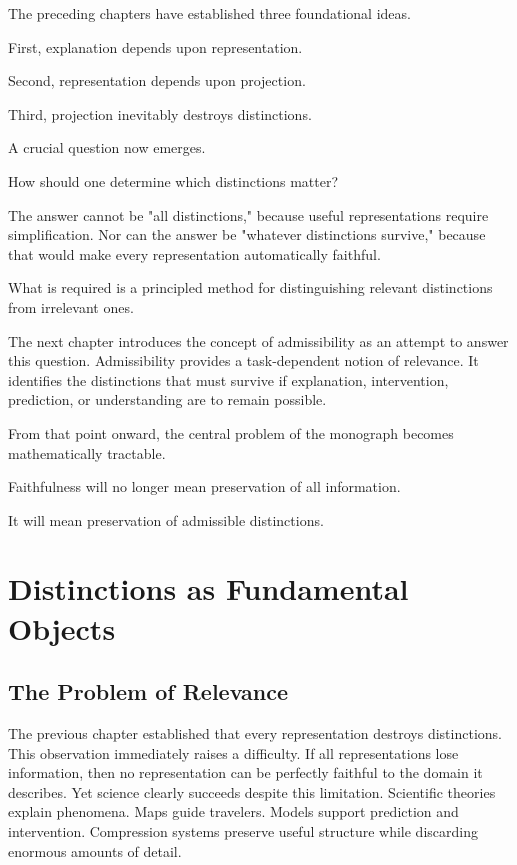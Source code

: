 \documentclass[11pt,oneside,openany]{book}
\begin{document}
The preceding chapters have established three foundational ideas.

First, explanation depends upon representation.

Second, representation depends upon projection.

Third, projection inevitably destroys distinctions.

A crucial question now emerges.

How should one determine which distinctions matter?

The answer cannot be "all distinctions," because useful representations require simplification. Nor can the answer be "whatever distinctions survive," because that would make every representation automatically faithful.

What is required is a principled method for distinguishing relevant distinctions from irrelevant ones.

The next chapter introduces the concept of admissibility as an attempt to answer this question. Admissibility provides a task-dependent notion of relevance. It identifies the distinctions that must survive if explanation, intervention, prediction, or understanding are to remain possible.

From that point onward, the central problem of the monograph becomes mathematically tractable.

Faithfulness will no longer mean preservation of all information.

It will mean preservation of admissible distinctions.

\chapter{Distinctions as Fundamental Objects}

\section{The Problem of Relevance}

The previous chapter established that every representation destroys distinctions. This observation immediately raises a difficulty. If all representations lose information, then no representation can be perfectly faithful to the domain it describes. Yet science clearly succeeds despite this limitation. Scientific theories explain phenomena. Maps guide travelers. Models support prediction and intervention. Compression systems preserve useful structure while discarding enormous amounts of detail.
\end{document}
